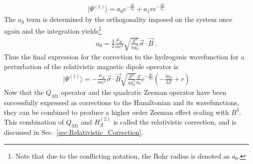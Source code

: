            \begin{align}
                \vert \varPsi^{(1)} \rangle = a_0 e^{-\frac{Zr}{a_0}} + a_1 re^{-\frac{Zr}{a_0}}
            \end{align}
            \noindent The $a_0$ term is determined by the orthogonality imposed on the system once again and the integration yields\footnote{Note that due to the conflicting notation, the Bohr radius is denoted as $\bar{a_0}$.}
            \begin{align}
                a_0 = \frac{3}{2}\frac{\mu_B}{mc^2} \sqrt{\frac{Z^3}{\pi \bar{a}_0^3}} \vec{\sigma} \cdot \vec{B} \;.
            \end{align}
            \noindent Thus the final expression for the correction to the hydrogenic wavefunction for a perturbation of the relativistic magnetic dipole operator is 
            \begin{align}
                \vert \varPsi^{(1)} \rangle = - \frac{\mu_B}{mc^2} \vec{\sigma} \cdot \vec{B} \sqrt{\frac{Z^3}{\pi \bar{a}_0^3}} \frac{Z}{\bar{a}_0} e^{-\frac{Zr}{a_0}} \left( - \frac{3\bar{a}_0}{2Z} + r \right)
            \end{align}
            \noindent Now that the $Q_{M1}$ operator and the quadratic Zeeman operator have been successfully expressed as corrections to the Hamiltonian and its wavefunctions, they can be combined to produce a higher order Zeeman effect scaling with $B^3$. This combination of $Q_{M1}$ and $H_Z^{(2)}$ is called the relativistic correction, and is discussed in Sec.~\ref{sec:Relativistic_Correction}.
